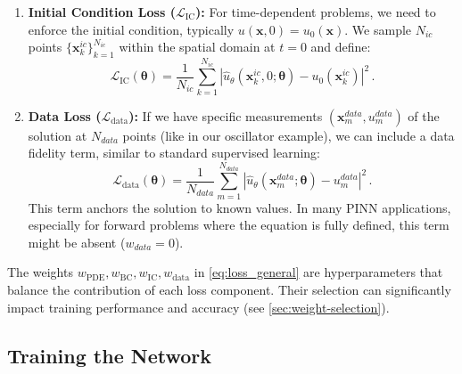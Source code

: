 \begin{enumerate}
    \item \textbf{Initial Condition Loss ($\mathcal{L}_{\text{IC}}$):} For time-dependent problems, we need to enforce the initial condition, typically $u(\mathbf{x}, 0) = u_0(\mathbf{x})$. We sample $N_{ic}$ points $\{\mathbf{x}_k^{ic}\}_{k=1}^{N_{ic}}$ within the spatial domain at $t=0$ and define:
    \begin{equation}
    \mathcal{L}_{\text{IC}}(\boldsymbol{\theta}) = \frac{1}{N_{ic}} \sum_{k=1}^{N_{ic}} \left| \hat{u}_\theta(\mathbf{x}_k^{ic}, 0; \boldsymbol{\theta}) - u_0(\mathbf{x}_k^{ic}) \right|^2\,.
    \label{eq:ic_loss_general}
    \end{equation}

    \item \textbf{Data Loss ($\mathcal{L}_{\text{data}}$):} If we have specific measurements $( \mathbf{x}_m^{data}, u_m^{data} )$ of the solution at $N_{data}$ points (like in our oscillator example), we can include a data fidelity term, similar to standard supervised learning:
    \begin{equation}
    \mathcal{L}_{\text{data}}(\boldsymbol{\theta}) = \frac{1}{N_{data}} \sum_{m=1}^{N_{data}} \left| \hat{u}_\theta(\mathbf{x}_m^{data}; \boldsymbol{\theta}) - u_m^{data} \right|^2\,.
    \label{eq:data_loss_general}
    \end{equation}
    This term anchors the solution to known values. In many PINN applications, especially for forward problems where the equation is fully defined, this term might be absent ($w_{data}=0$).
\end{enumerate}

The weights $w_{\text{PDE}}, w_{\text{BC}}, w_{\text{IC}}, w_{\text{data}}$ in \cref{eq:loss_general} are hyperparameters that balance the contribution of each loss component. Their selection can significantly impact training performance and accuracy (see \cref{sec:weight-selection}).

\subsection{Training the Network}

